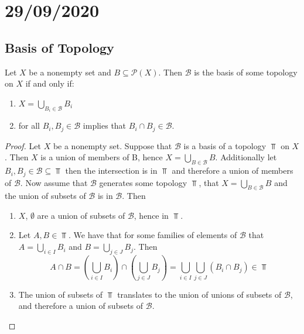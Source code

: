\documentclass[../../main/main.tex]{subfiles}
\begin{document}
\chapter{29/09/2020}
\label{cpt:lec3}

\section{Basis of Topology}
\label{sec:basis}

\begin{definition}
  Let $X$ be a nonempty set and $B \subseteq \mathcal{P}(X)$. Then $\mathcal{B}$ is the basis of some topology on $X$ if and only if:
  \begin{enumerate}
    \item $X = \bigcup_{B_i \in \mathcal{B}} B_{i}$
    \item for all $B_i, B_j \in \mathcal{B}$ implies that $B_{i} \cap B_{j} \in \mathcal{B}$.
  \end{enumerate}
\end{definition}

\begin{proof}
  Let $X$ be a nonempty set. Suppose that $\mathcal{B}$ is a basis of a topology $\Top$ on $X$. Then $X$ is a union of members of B, hence $X=\bigcup_{B\in\mathcal{B}} B$. Additionally let $B_{i}, B_{j} \in \mathcal{B} \subseteq \Top$ then the intersection is in $\Top$ and therefore a union of members of $\mathcal{B}$.
  Now assume that $\mathcal{B}$ generates some topology $\Top$, that $X = \bigcup_{B \in \mathcal{B}} B$ and the union of subsets of $\mathcal{B}$ is in $\mathcal{B}$. Then
  \begin{enumerate}
    \item $X$, $\emptyset$ are a union of subsets of $\mathcal{B}$, hence in $\Top$.
    \item Let $A, B \in \Top$. We have that for some families of elements of $\mathcal{B}$ that $A=\bigcup_{i \in I}B_{i}$ and $B=\bigcup_{j \in J}B_{j}$. Then
      \begin{equation*}
        A \cap B = \left( \bigcup_{i \in I}B_{i} \right) \cap \left( \bigcup_{j \in J}B_{j} \right) = \bigcup_{i \in I} \bigcup_{j \in J} \left( B_{i} \cap B_{j} \right) \in \Top
      \end{equation*}
    \item The union of subsets of $\Top$ translates to the union of unions of subsets of $\mathcal{B}$, and therefore a union of subsets of $\mathcal{B}$.
  \end{enumerate}
\end{proof}
\end{document}
